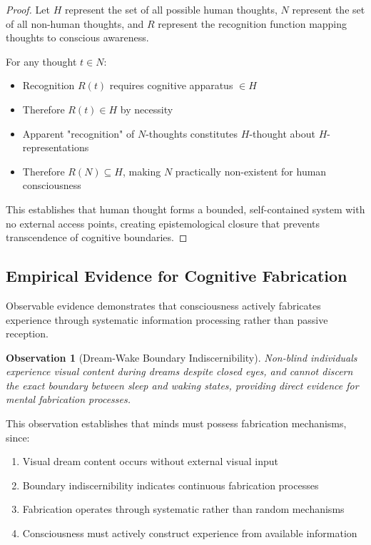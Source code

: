 \documentclass[12pt,a4paper]{article}
\newtheorem{observation}[theorem]{Observation}
\begin{document}
\begin{proof}
Let $H$ represent the set of all possible human thoughts, $N$ represent the set of all non-human thoughts, and $R$ represent the recognition function mapping thoughts to conscious awareness.

For any thought $t \in N$:
\begin{itemize}
\item Recognition $R(t)$ requires cognitive apparatus $\in H$
\item Therefore $R(t) \in H$ by necessity
\item Apparent "recognition" of $N$-thoughts constitutes $H$-thought about $H$-representations
\item Therefore $R(N) \subseteq H$, making $N$ practically non-existent for human consciousness
\end{itemize}

This establishes that human thought forms a bounded, self-contained system with no external access points, creating epistemological closure that prevents transcendence of cognitive boundaries.
\end{proof}

\subsection{Empirical Evidence for Cognitive Fabrication}

Observable evidence demonstrates that consciousness actively fabricates experience through systematic information processing rather than passive reception.

\begin{observation}[Dream-Wake Boundary Indiscernibility]
Non-blind individuals experience visual content during dreams despite closed eyes, and cannot discern the exact boundary between sleep and waking states, providing direct evidence for mental fabrication processes.
\end{observation}

This observation establishes that minds must possess fabrication mechanisms, since:
\begin{enumerate}
\item Visual dream content occurs without external visual input
\item Boundary indiscernibility indicates continuous fabrication processes
\item Fabrication operates through systematic rather than random mechanisms
\item Consciousness must actively construct experience from available information
\end{enumerate}
\end{document}
